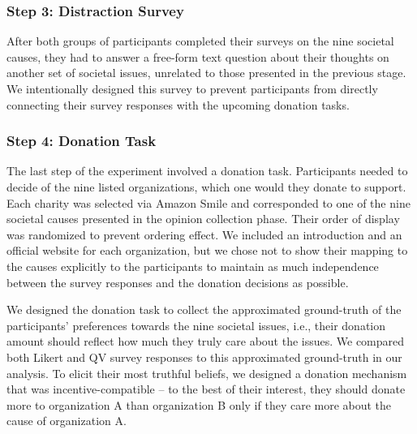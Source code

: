 
\subsubsection{Step 3: Distraction Survey}
After both groups of participants completed their surveys on the nine societal causes, they had to answer a free-form text question about their thoughts on another set of societal issues, unrelated to those presented in the previous stage. We intentionally designed this survey to prevent participants from directly connecting their survey responses with the upcoming donation tasks. 

\subsubsection{Step 4: Donation Task}
The last step of the experiment involved a donation task. Participants needed to decide of the nine listed organizations, which one would they donate to support. Each charity was selected via Amazon Smile and corresponded to one of the nine societal causes presented in the opinion collection phase. Their order of display was randomized to prevent ordering effect. We included an introduction and an official website for each organization, but we chose not to show their mapping to the causes explicitly to the participants to maintain as much independence between the survey responses and the donation decisions as possible. 

We designed the donation task to collect the approximated ground-truth of the participants' preferences towards the nine societal issues, i.e., their donation amount should reflect how much they truly care about the issues. We compared both Likert and QV survey responses to this approximated ground-truth in our analysis. To elicit their most truthful beliefs, we designed a donation mechanism that was incentive-compatible -- to the best of their interest, they should donate more to organization A than organization B only if they care more about the cause of organization A. 

